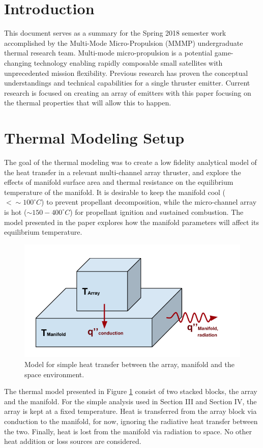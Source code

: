 \documentclass[journal]{new-aiaa}
\begin{document}
\section{Introduction}
This document serves as a summary for the Spring 2018 semester work accomplished by the Multi-Mode Micro-Propulsion (MMMP) undergraduate thermal research team. Multi-mode  micro-propulsion  is  a  potential  game-changing  technology  enabling  rapidly composable   small   satellites   with   unprecedented   mission   flexibility. Previous research has proven the conceptual understandings and technical capabilities for a single thruster emitter. Current research is focused on creating an array of emitters with this paper focusing on the thermal properties that will allow this to happen. 

\section{Thermal Modeling Setup}
The goal of the thermal modeling was to create a low fidelity analytical model of the heat transfer in a relevant multi-channel array thruster, and explore the effects of manifold surface area and thermal resistance on the equilibrium temperature of the manifold. It is desirable to keep the manifold cool ($<\sim100^{\circ}C$) to prevent propellant decomposition, while the micro-channel array is hot ($\sim150-400^{\circ}C$) for propellant ignition and sustained combustion.  The model presented in the paper explores how the manifold parameters will affect its equilibrium temperature.

\begin{figure}[hbt!]
\centering
\includegraphics[width=.7\textwidth]{model.png}
\caption{Model for simple heat transfer between the array, manifold and the space environment.}
\label{modelFigure}
\end{figure}
The thermal model presented in Figure \ref{modelFigure} consist of two stacked blocks, the array and the manifold. For the simple analysis used in Section III and Section IV, the array is kept at a fixed temperature. Heat is transferred from the array block via conduction to the manifold, for now, ignoring the radiative heat transfer between the two. Finally, heat is lost from the manifold via radiation to space. No other heat addition or loss sources are considered.
\end{document}
